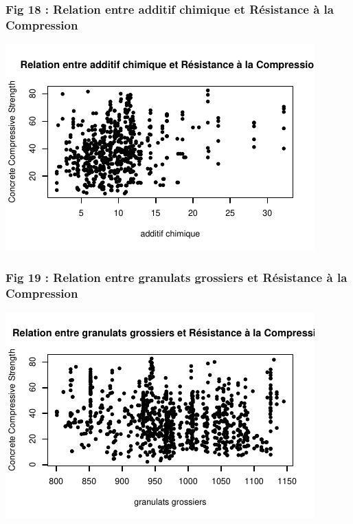 \documentclass[
  12pt,
]{article}
\begin{document}
\subsubsection{Fig 18 : Relation entre additif chimique et Résistance à
la
Compression}\label{fig-18-relation-entre-additif-chimique-et-ruxe9sistance-uxe0-la-compression}

\begin{center}\includegraphics{rmd_final_files/figure-latex/unnamed-chunk-38-1} \end{center}

\subsubsection{Fig 19 : Relation entre granulats grossiers et Résistance
à la
Compression}\label{fig-19-relation-entre-granulats-grossiers-et-ruxe9sistance-uxe0-la-compression}

\begin{center}\includegraphics{rmd_final_files/figure-latex/unnamed-chunk-39-1} \end{center}
\end{document}
